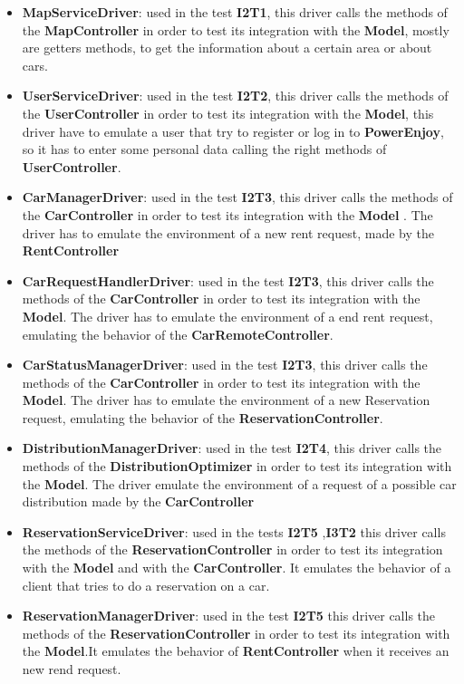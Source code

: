 \begin{itemize}
\item \textbf{MapServiceDriver}: used in the test \textbf{I2T1},  this driver calls the methods of the \textbf{MapController} in order to test its integration with the \textbf{Model}, mostly are getters methods, to get the information about a certain area or about cars.
\item \textbf{UserServiceDriver}: used in the test \textbf{I2T2},  this driver calls the methods of the \textbf{UserController} in order to test its integration with the \textbf{Model}, this driver have to emulate a user that try to register or log in to \textbf{PowerEnjoy}, so it has to enter some personal data calling the right methods of \textbf{UserController}.
\item \textbf{CarManagerDriver}: used in the test \textbf{I2T3},  this driver calls the methods of the \textbf{CarController} in order to test its integration with the \textbf{Model} . The driver has to emulate the environment of a new rent request, made by the \textbf{RentController}
\item \textbf{CarRequestHandlerDriver}: used in the test \textbf{I2T3},  this driver calls the methods of the \textbf{CarController} in order to test its integration with the \textbf{Model}. The driver has to emulate the environment of a end rent request, emulating the behavior of the \textbf{CarRemoteController}.
\item \textbf{CarStatusManagerDriver}: used in the test \textbf{I2T3},  this driver calls the methods of the \textbf{CarController} in order to test its integration with the \textbf{Model}. The driver has to emulate the environment of a new Reservation request, emulating the behavior of the \textbf{ReservationController}.
\item \textbf{DistributionManagerDriver}: used in the test \textbf{I2T4},  this driver calls the methods of the \textbf{DistributionOptimizer} in order to test its integration with the \textbf{Model}. The driver emulate the environment of a request of a possible car distribution made by the \textbf{CarController}
\item \textbf{ReservationServiceDriver}: used in the tests \textbf{I2T5} ,\textbf{I3T2}  this driver calls the methods of the \textbf{ReservationController} in order to test its integration with the \textbf{Model} and with the \textbf{CarController}. It emulates the behavior of a client that tries to do a reservation on a car.
\item  \textbf{ReservationManagerDriver}: used in the test \textbf{I2T5}  this driver calls the methods of the \textbf{ReservationController} in order to test its integration with the \textbf{Model}.It emulates the behavior of  \textbf{RentController} when it receives an new rend request. 

\end{itemize}

